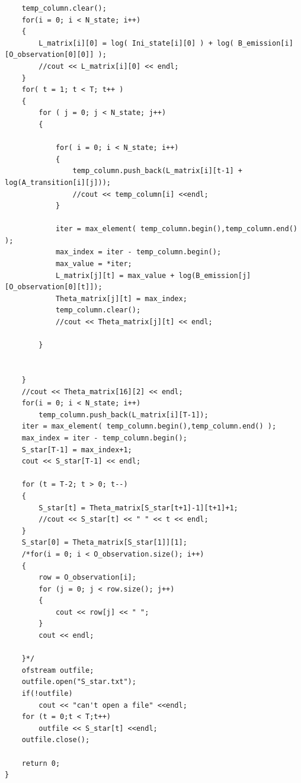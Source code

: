 \documentclass[18pt]{article} %
\theoremstyle{definition}\newtheorem{law}{Law}
\theoremstyle{plain}\newtheorem{jury}[law]{Jury}
\theoremstyle{remark}\newtheorem{juu}{Juu}
\theoremstyle{definition}\newtheorem{kuu}[law]{Kuu}
\theoremstyle{definition}\newtheorem{muu}{Muu}[section]
\theoremstyle{definition}\newtheorem{honoluu}{Honoluu}[section]
\theoremstyle{definition}\newtheorem{konoluu}[muu]{Konoluu}
\begin{document}
\begin{lstlisting}
    temp_column.clear();
    for(i = 0; i < N_state; i++)
    {
        L_matrix[i][0] = log( Ini_state[i][0] ) + log( B_emission[i][O_observation[0][0]] );
        //cout << L_matrix[i][0] << endl;
    }
    for( t = 1; t < T; t++ )
    {
        for ( j = 0; j < N_state; j++)
        {
            
            for( i = 0; i < N_state; i++)
            {
                temp_column.push_back(L_matrix[i][t-1] + log(A_transition[i][j]));
                //cout << temp_column[i] <<endl;
            }
            
            iter = max_element( temp_column.begin(),temp_column.end() );
            max_index = iter - temp_column.begin();
            max_value = *iter;
            L_matrix[j][t] = max_value + log(B_emission[j][O_observation[0][t]]);
            Theta_matrix[j][t] = max_index;
            temp_column.clear();
            //cout << Theta_matrix[j][t] << endl;

        }
        

    }
    //cout << Theta_matrix[16][2] << endl;
    for(i = 0; i < N_state; i++)
        temp_column.push_back(L_matrix[i][T-1]);
    iter = max_element( temp_column.begin(),temp_column.end() );
    max_index = iter - temp_column.begin();
    S_star[T-1] = max_index+1;
    cout << S_star[T-1] << endl;
    
    for (t = T-2; t > 0; t--)
    {
        S_star[t] = Theta_matrix[S_star[t+1]-1][t+1]+1;
        //cout << S_star[t] << " " << t << endl;
    }
    S_star[0] = Theta_matrix[S_star[1]][1];
    /*for(i = 0; i < O_observation.size(); i++)
    {
        row = O_observation[i];
        for (j = 0; j < row.size(); j++)
        {
            cout << row[j] << " ";
        }
        cout << endl;
        
    }*/
    ofstream outfile;
    outfile.open("S_star.txt");
    if(!outfile)
        cout << "can't open a file" <<endl;
    for (t = 0;t < T;t++)
        outfile << S_star[t] <<endl;
    outfile.close();

    return 0;
}
\end{lstlisting}
\end{document}
